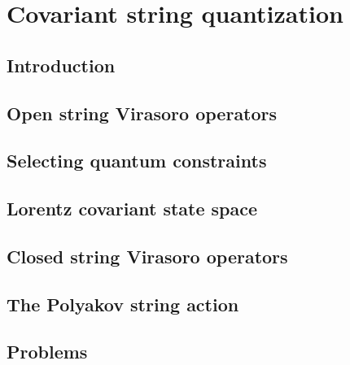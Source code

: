 \documentclass[12pt]{report}
\begin{document}
\chapter{Covariant string quantization}
\newpage
\section{Introduction}
\section{Open string Virasoro operators}
\section{Selecting quantum constraints}
\section{Lorentz covariant state space}
\section{Closed string Virasoro operators}
\section{The Polyakov string action}
\section{Problems}
\end{document}
